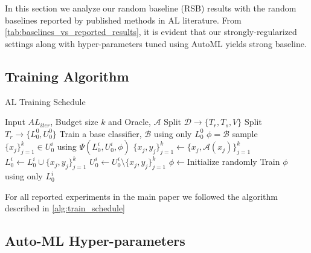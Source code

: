 \documentclass[10pt,twocolumn,letterpaper]{article}
\begin{document}
In this section we analyze our random baseline (RSB) results with the random baselines reported by published methods in AL literature. From \cref{tab:baselines_vs_reported_results}, it is evident that our strongly-regularized settings along with hyper-parameters tuned using AutoML yields strong baseline. 




















\subsection{Training Algorithm}

\begin{algorithm}[ht]
    \SetAlgoLined
	\caption{AL Training Schedule}
	\label{alg:train_schedule}
	
	\begin{algorithmic}[1]
	    \STATE Input $AL_{iter}$, Budget size $k$ and Oracle, $\mathcal{A}$
        \STATE Split $\mathcal{D} \rightarrow \{T_{r}, T_{s}, V\} $
        \STATE Split $T_{r} \rightarrow \{L_{0}^{0}, U_{0}^{0}\} $
        \STATE Train a base classifier, $\mathcal{B}$ using only $L_{0}^{0}$
        \STATE $\phi = \mathcal{B}$
            \STATE sample $\{ x_j\}_{j=1}^{k}\in U_{0}^{i}$ using $\Psi(L_{0}^{i}, U_{0}^{i}, \phi)$
            \STATE $\{x_j,y_j\}_{j=1}^{k} \leftarrow \{x_j,\mathcal{A}(x_j)\}_{j=1}^{k} $ \STATE $L_{0}^{i} \leftarrow L_{0}^{i} \cup \{x_j,y_j\}_{j=1}^{k}$
            \STATE $U_{0}^{i} \leftarrow U_{0}^{i} \setminus \{x_j,y_j\}_{j=1}^{k}$
            \STATE $\phi \leftarrow $Initialize randomly
                \STATE Train $\phi$ using only $L_{0}^{i}$
            \ENDWHILE
        \ENDWHILE
	\end{algorithmic}
\end{algorithm}

For all reported experiments in the main paper we followed the algorithm described in \cref{alg:train_schedule}




\subsection{Auto-ML Hyper-parameters}
\label{sup:AutoMLhyperparamssection}
\end{document}
